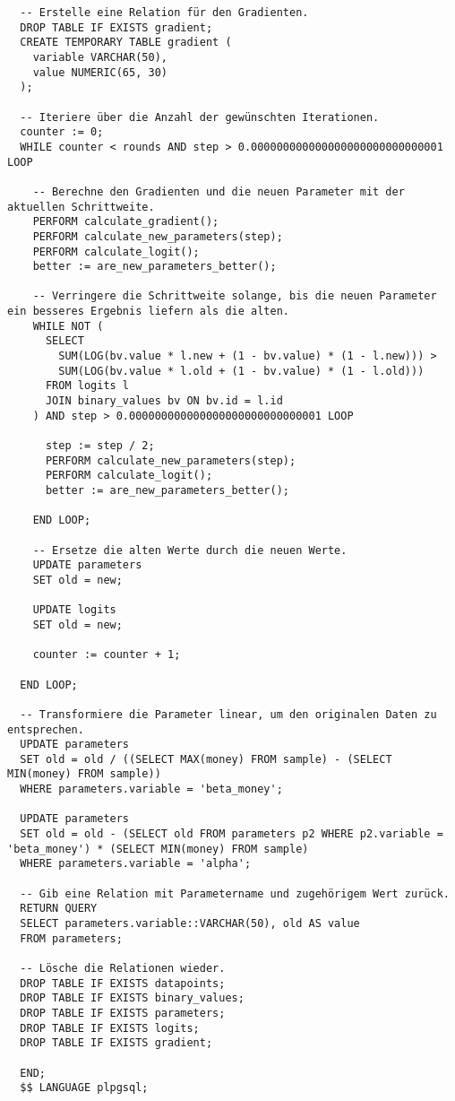 \begin{verbatim}
  -- Erstelle eine Relation für den Gradienten.
  DROP TABLE IF EXISTS gradient;
  CREATE TEMPORARY TABLE gradient (
    variable VARCHAR(50),
    value NUMERIC(65, 30)
  );

  -- Iteriere über die Anzahl der gewünschten Iterationen.
  counter := 0;
  WHILE counter < rounds AND step > 0.000000000000000000000000000001 LOOP

    -- Berechne den Gradienten und die neuen Parameter mit der aktuellen Schrittweite.
    PERFORM calculate_gradient();
    PERFORM calculate_new_parameters(step);
    PERFORM calculate_logit();
    better := are_new_parameters_better();

    -- Verringere die Schrittweite solange, bis die neuen Parameter ein besseres Ergebnis liefern als die alten.
    WHILE NOT (
      SELECT
        SUM(LOG(bv.value * l.new + (1 - bv.value) * (1 - l.new))) >
        SUM(LOG(bv.value * l.old + (1 - bv.value) * (1 - l.old)))
      FROM logits l
      JOIN binary_values bv ON bv.id = l.id
    ) AND step > 0.000000000000000000000000000001 LOOP

      step := step / 2;
      PERFORM calculate_new_parameters(step);
      PERFORM calculate_logit();
      better := are_new_parameters_better();

    END LOOP;

    -- Ersetze die alten Werte durch die neuen Werte.
    UPDATE parameters
    SET old = new;

    UPDATE logits
    SET old = new;

    counter := counter + 1;

  END LOOP;

  -- Transformiere die Parameter linear, um den originalen Daten zu entsprechen.
  UPDATE parameters
  SET old = old / ((SELECT MAX(money) FROM sample) - (SELECT MIN(money) FROM sample))
  WHERE parameters.variable = 'beta_money';

  UPDATE parameters
  SET old = old - (SELECT old FROM parameters p2 WHERE p2.variable = 'beta_money') * (SELECT MIN(money) FROM sample)
  WHERE parameters.variable = 'alpha';

  -- Gib eine Relation mit Parametername und zugehörigem Wert zurück.
  RETURN QUERY
  SELECT parameters.variable::VARCHAR(50), old AS value
  FROM parameters;

  -- Lösche die Relationen wieder.
  DROP TABLE IF EXISTS datapoints;
  DROP TABLE IF EXISTS binary_values;
  DROP TABLE IF EXISTS parameters;
  DROP TABLE IF EXISTS logits;
  DROP TABLE IF EXISTS gradient;

  END;
  $$ LANGUAGE plpgsql;
\end{verbatim}

